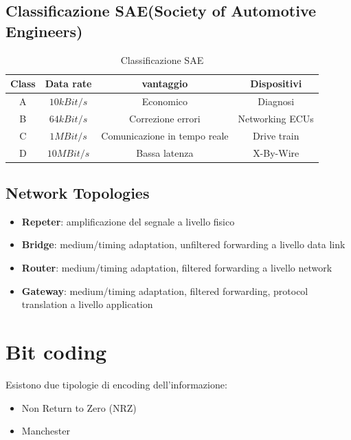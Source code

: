\subsection{Classificazione SAE(Society of Automotive Engineers)}

\begin{table}
	\begin{adjustbox}{width=\columnwidth, center}
		\begin{tabular}{|c|c|c|c|}
			\hline
			Class & Data rate  & vantaggio                    & Dispositivi     \\
			\hline
			A     & $10kBit/s$ & Economico                    & Diagnosi        \\
			B     & $64kBit/s$ & Correzione errori            & Networking ECUs \\
			C     & $1MBit/s$  & Comunicazione in tempo reale & Drive train     \\
			D     & $10MBit/s$ & Bassa latenza                & X-By-Wire       \\
			\hline
		\end{tabular}
	\end{adjustbox}
	\caption{Classificazione SAE}
	\label{tab:classification_sae}
\end{table}



\subsection{Network Topologies}

\begin{itemize}
	\item \textbf{Repeter}: amplificazione del segnale a livello fisico
	\item \textbf{Bridge}: medium/timing adaptation, unfiltered forwarding a livello data link
	\item \textbf{Router}: medium/timing adaptation, filtered forwarding a livello network
	\item \textbf{Gateway}: medium/timing adaptation, filtered forwarding, protocol translation a livello application
\end{itemize}



\section{Bit coding}

Esistono due tipologie di encoding dell'informazione:
\begin{itemize}
  \item Non Return to Zero (NRZ)
  \item Manchester
\end{itemize}

